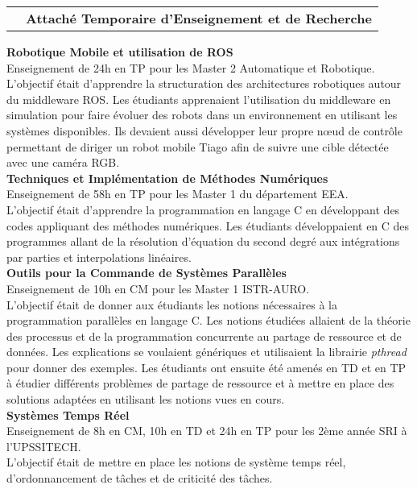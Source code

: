 \documentclass[11pt,a4paper,sans]{moderncv}         %
\makeatletter
\newcommand*{\cventrylong}[7][.25em]{%
  \begin{tabular}{@{}p{\hintscolumnwidth}@{\hspace{\separatorcolumnwidth}}p{\maincolumnwidth}@{}}%
    \raggedleft\hintstyle{#2} &{%
        {\bfseries#3}%
        \ifthenelse{\equal{#4}{}}{}{, {\slshape#4}}%
        \ifthenelse{\equal{#5}{}}{}{, #5}%
        \ifthenelse{\equal{#6}{}}{}{, #6}%
    }%
  \end{tabular}%
  \begin{addmargin}[\hintscolumnwidth+\separatorcolumnwidth]{0em}%
    {\small#7}%
  \end{addmargin}%
  \par\addvspace{#1}}
\makeatother
\begin{document}
%
\cventrylong
{2022 -- 2023}
{Attach\'e Temporaire d'Enseignement et de Recherche}
{Universit\'e Paul Sabatier Toulouse III (31)}
{Facult\'e Sciences et Ing\'enierie}
{D\'epartement Electronique, Energie \'electrique et Automatique}
{
  \textbf{Robotique Mobile et utilisation de ROS}\\
  Enseignement de 24h en TP pour les Master 2 Automatique et Robotique.\\
  L'objectif \'etait d'apprendre la structuration des architectures robotiques autour du middleware ROS.
  Les \'etudiants apprenaient l'utilisation du middleware en simulation pour faire \'evoluer des robots dans un environnement en utilisant les syst\`emes disponibles.
  Ils devaient aussi d\'evelopper leur propre n\oe ud de contr\^ole permettant de diriger un robot mobile Tiago afin de suivre une cible d\'etect\'ee avec une cam\'era RGB.\\
  \textbf{Techniques et Impl\'ementation de M\'ethodes Num\'eriques}\\
  Enseignement de 58h en TP pour les Master 1 du d\'epartement EEA.\\
  L'objectif \'etait d'apprendre la programmation en langage C en d\'eveloppant des codes appliquant des m\'ethodes num\'eriques.
  Les \'etudiants d\'eveloppaient en C des programmes allant de la r\'esolution d'\'equation du second degr\'e aux int\'egrations par parties et interpolations lin\'eaires.\\
  \textbf{Outils pour la Commande de Syst\`emes Parall\`eles}\\
  Enseignement de 10h en CM pour les Master 1 ISTR-AURO.\\
  L'objectif \'etait de donner aux \'etudiants les notions n\'ecessaires \`a la programmation parall\`eles en langage C.
  Les notions \'etudi\'ees allaient de la th\'eorie des processus et de la programmation concurrente au partage de ressource et de donn\'ees.
  Les explications se voulaient g\'en\'eriques et utilisaient la librairie \emph{pthread} pour donner des exemples.
  Les \'etudiants ont ensuite \'et\'e amen\'es en TD et en TP \`a \'etudier diff\'erents probl\`emes de partage de ressource et \`a mettre en place des solutions adapt\'ees en utilisant les notions vues en cours.\\
  \textbf{Syst\`emes Temps R\'eel}\\
  Enseignement de 8h en CM, 10h en TD et 24h en TP pour les 2\`eme ann\'ee SRI \`a l'UPSSITECH.\\
  L'objectif \'etait de mettre en place les notions de syst\`eme temps r\'eel, d'ordonnancement de t\^aches et de criticit\'e des t\^aches.
}
\end{document}
